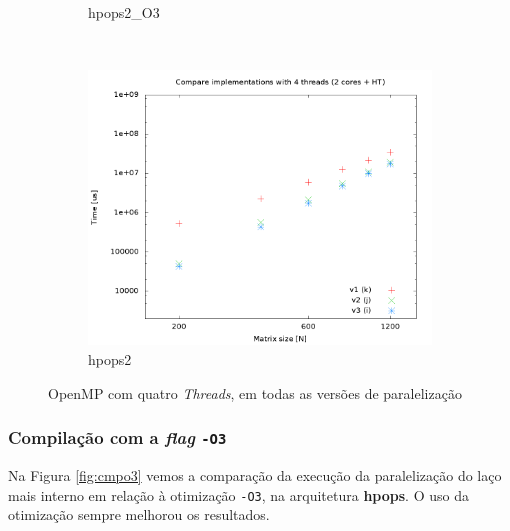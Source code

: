 \documentclass[a4paper, 12pt]{article}
\begin{document}
\begin{figure}[H]
\begin{subfigure}[H]{0.5\textwidth}
        \caption{hpops2\_O3}
        \label{fig:hpops2_O3_cmp_4t}
    \end{subfigure}
    ~ %
    \begin{subfigure}[H]{0.5\textwidth}
        \includegraphics[width=\textwidth]{hpops2_cmp_versions-4t}
        \caption{hpops2}
        \label{fig:hpops2_cmp_4t}
    \end{subfigure}%
    \caption{OpenMP com quatro \textit{Threads}, em todas as versões de paralelização}\label{fig:animals}
\end{figure}

\newpage
\subsubsection{Compilação com a \textit{flag} \texttt{-O3}}

Na Figura \ref{fig:cmpo3} vemos a comparação da execução da paralelização do
laço mais interno em relação à otimização \texttt{-O3}, na arquitetura
\textbf{hpops}. O uso da otimização sempre melhorou os resultados.
\end{document}
